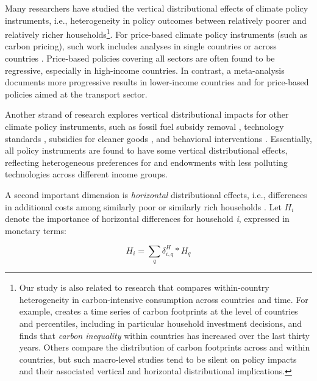 \documentclass[12pt, a4paper]{article}
\begin{document}
Many researchers have studied the vertical distributional effects of climate policy instruments, i.e., heterogeneity in policy outcomes between relatively poorer and relatively richer households\footnote{Our study is also related to research that compares within-country heterogeneity in carbon-intensive consumption across countries and time. For example, \textcite{Chancel.2022b} creates a time series of carbon footprints at the level of countries and percentiles, including in particular household investment decisions, and finds that \textit{carbon inequality} within countries has increased over the last thirty years. Others \autocite{Oswald.2020,Bruckner.2022} compare the distribution of carbon footprints across and within countries, but such macro-level studies tend to be silent on policy impacts and their associated vertical and horizontal distributional implications.}. For price-based climate policy instruments (such as carbon pricing), such work includes analyses in single countries \autocite{Poterba.1991,Goulder.2019,Grainger.2010,Rausch.2011,Garaffa.2021,Sterner.2012,Wu.2022} or across countries \autocite{Budolfson.2021,Feindt.2021,Dorband.2019,Steckel.2021b,VogtSchilb.2019,Missbach.2024}. Price-based policies covering all sectors are often found to be regressive, especially in high-income countries. In contrast, a meta-analysis \autocite{Ohlendorf.2021} documents more progressive results in lower-income countries and for price-based policies aimed at the transport sector.

Another strand of research explores vertical distributional impacts for other climate policy instruments, such as fossil fuel subsidy removal \autocite{Schaffitzel.2019,Giuliano.2020,DelArzeGranado.2012}, technology standards \autocite{Levinson.2019,Zhao.2022,Bruegge.2019}, subsidies for cleaner goods \autocite{Borenstein.2016,Vaishnav.2017,Winter.2019}, and behavioral interventions \autocite{DellaValle.2020,Liebe.2021}. Essentially, all policy instruments are found to have some vertical distributional effects, reflecting heterogeneous preferences for and endowments with less polluting technologies across different income groups. 

A second important dimension is \textit{horizontal} distributional effects, i.e., differences in additional costs among similarly poor or similarly rich households \autocite{Rausch.2011,Fischer.2019}. Let $H_{i}$ denote the importance of horizontal differences for household \textit{i}, expressed in monetary terms:

\begin{equation}\label{eq_H}
    H_{i} = \sum_{q} \delta_{i,q}^{H} * H_{q}
\end{equation}
\end{document}
